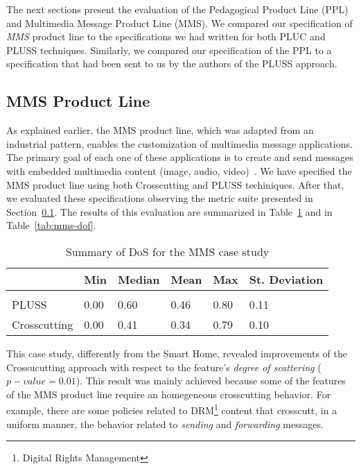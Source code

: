 The next sections present the evaluation of the Pedagogical Product Line (PPL)
and Multimedia Message Product Line (MMS). We compared our specification of
\emph{MMS} product line to the specifications we had written for both PLUC and
PLUSS techniques. Similarly, we compared our specification
of the PPL to a specification that had been sent to us by
the authors of the PLUSS approach.

\subsection{MMS Product Line}

As explained earlier, the MMS product line, which was adapted from an industrial
pattern, enables the customization of multimedia message applications. The
primary goal of each one of these applications is to create and send messages
with embedded multimedia content (image, audio, video)~\cite{Bonifacio:2008aa}.
We have specified the MMS product line using both Crosscutting and PLUSS
techiniques. After that, we evaluated these specifications observing the metric
suite presented in Section~\ref{}. The results of this evaluation are summarized
in Table~\ref{tab:mms-dos} and in Table~\ref{tab:mms-dof}.

\begin{table}[htb] \centering
\caption{Summary of DoS for the MMS case study}
\label{tab:mms-dos}
\begin{small}
\begin{tabular}{llllll} \hline
					& Min 	& Median 	& Mean 	& Max 	& St. Deviation \\ \hline \\
	PLUSS			& 0.00  & 0.60   	& 0.46  & 0.80 	& 0.11 			\\
	Crosscutting	& 0.00  & 0.41   	& 0.34 	& 0.79 	& 0.10			\\ \hline	
\end{tabular}
\end{small}
\end{table}

This case study, differently from the Smart Home, revealed improvements of the
Crossucutting approach with respect to the feature's \emph{degree of scattering}
($p-value=0.01$). This result was mainly achieved because some of the features of
the MMS product line require an homegeneous crosscutting behavior. For example,
there are some policies related to DRM\footnote{Digital Rights Management}
content that crosscutt, in a uniform manner, the behavior related to
\emph{sending} and \emph{forwarding} messages.

